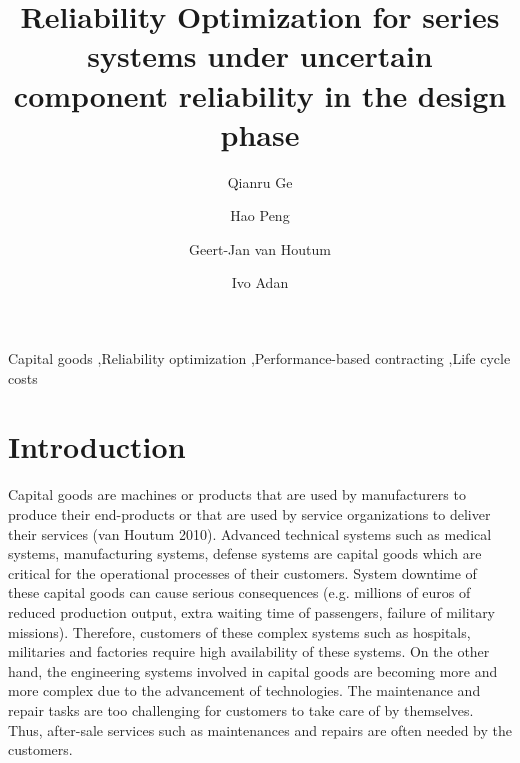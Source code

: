 \documentclass[preprint,12pt]{elsarticle}
\begin{document}
\nocite{*}

\begin{frontmatter}
\title{Reliability Optimization for series systems under uncertain component reliability in the design phase}
\author[label1]{Qianru Ge}
\author[label1]{Hao Peng}
\author[label1]{Geert-Jan van Houtum}
\author[label1]{Ivo Adan}



\address[label1]{Department of Industrial Engineering and Innovation Sciences, Eindhoven University of Technology, Eindhoven, The Netherlands}


\begin{keyword}
Capital goods \sep Reliability optimization  \sep Performance-based contracting \sep Life cycle costs
\end{keyword}
\end{frontmatter}

\section{Introduction}

Capital goods are machines or products that are used by manufacturers to produce their end-products or
that are used by service organizations to deliver their services (van Houtum 2010). Advanced technical systems such as medical systems, manufacturing systems, defense systems are capital goods which are critical for the operational processes of their customers. System downtime of these capital goods can cause serious consequences (e.g. millions of euros of reduced production output, extra waiting time of passengers, failure of military missions). Therefore, customers of these complex systems such as hospitals, militaries and factories require high availability of these systems. On the other hand, the engineering systems involved in capital goods are becoming more and more complex due to the advancement of technologies. The maintenance and repair tasks are too challenging for customers to take care of by themselves. Thus, after-sale services such as maintenances and repairs are often needed by the customers.
\end{document}
